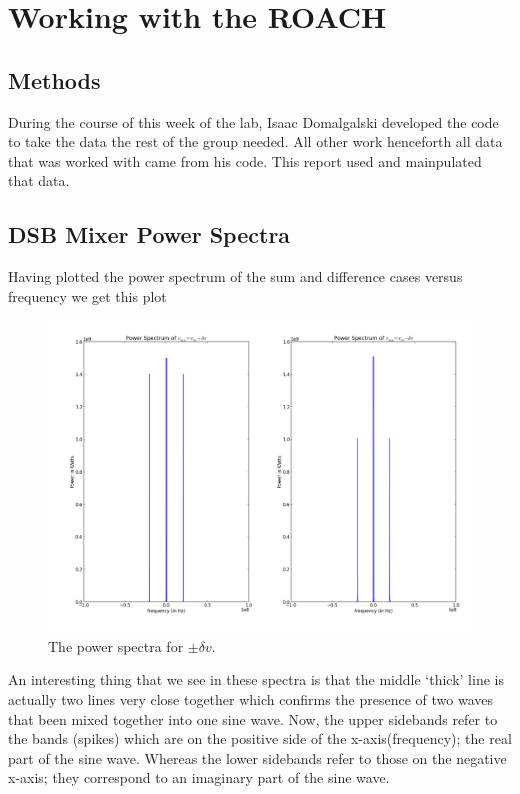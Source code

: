 \documentclass[12 pt]{article}
\begin{document}
\section{Working with the ROACH}

\subsection{Methods}
During the course of this week of the lab, Isaac Domalgalski developed
the code to take the data the rest of the group needed. All other work
henceforth all data that was worked with came from his code. This report
used and mainpulated that data. 

\subsection{DSB Mixer Power Spectra}
Having plotted the power spectrum of the sum and difference cases versus
frequency we get this plot
\begin{figure}[H]
\center
\includegraphics[scale=0.4]{powerspectmixed.png}
\caption{The power spectra for $\pm \delta v$.}
\label{powerspectmixed}
\end{figure}
An interesting thing that we see in these spectra is that the middle
`thick' line is actually two lines very close together which confirms
the presence of two waves that been mixed together into one sine
wave. Now, the upper sidebands refer to the bands (spikes) which are on
the positive side of the x-axis(frequency); the real part of the sine wave. Whereas
the lower sidebands refer to those on the negative x-axis; they
correspond to an imaginary part of the sine wave. 
\end{document}
